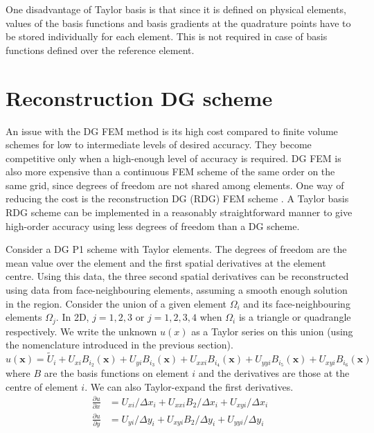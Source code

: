 \documentclass[11pt]{article}
\let\bld\boldsymbol
\begin{document}
One disadvantage of Taylor basis is that since it is defined on physical elements, values of the basis functions and basis gradients at the quadrature points have to be stored individually for each element. This is not required in case of basis functions defined over the reference element.

\section{Reconstruction DG scheme}
An issue with the DG FEM method is its high cost compared to finite volume schemes for low to intermediate levels of desired accuracy. They become competitive only when a high-enough level of accuracy is required. DG FEM is also more expensive than a continuous FEM scheme of the same order on the same grid, since degrees of freedom are not shared among elements. One way of reducing the cost is the reconstruction DG (RDG) FEM scheme \cite{luo_rdg}. A Taylor basis RDG scheme can be implemented in a reasonably straightforward manner to give high-order accuracy using less degrees of freedom than a DG scheme.

Consider a DG P1 scheme with Taylor elements. The degrees of freedom are the mean value over the element and the first spatial derivatives at the element centre. Using this data, the three second spatial derivatives can be reconstructed using data from face-neighbouring elements, assuming a smooth enough solution in the region. Consider the union of a given element $\Omega_i$ and its face-neighbouring elements $\Omega_j$. In 2D, $j = 1,2,3$ or $j = 1,2,3,4$ when $\Omega_i$ is a triangle or quadrangle respectively. We write the unknown $u(x)$ as a Taylor series on this union (using the nomenclature introduced in the previous section).
\begin{equation}
u(\bld{x}) = \tilde{U}_i + U_{xi}B_{i_2}(\bld{x}) + U_{yi}B_{i_3}(\bld{x}) + U_{xxi} B_{i_4}(\bld{x}) + U_{yyi} B_{i_5}(\bld{x}) + U_{xyi} B_{i_6}(\bld{x})
\end{equation}
where $B$ are the basis functions on element $i$ and the derivatives are those at the centre of element $i$. We can also Taylor-expand the first derivatives.
\begin{align}
\frac{\partial u}{\partial x} &= U_{xi}/\Delta x_i + U_{xxi} B_2 / \Delta x_i + U_{xyi}/\Delta x_i \\
\frac{\partial u}{\partial y} &= U_{yi}/\Delta y_i + U_{xyi} B_2 / \Delta y_i + U_{yyi}/\Delta y_i
\end{align}
\end{document}
